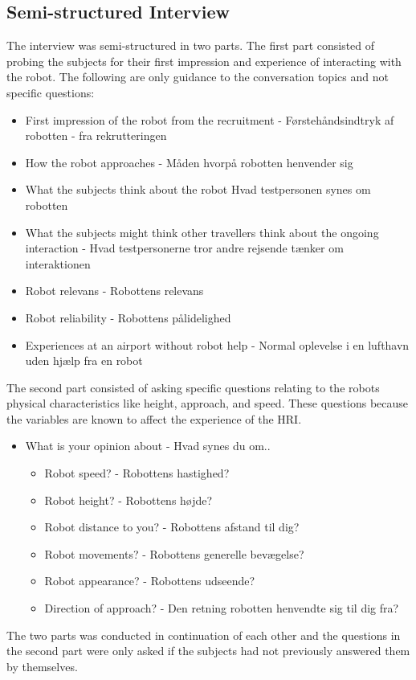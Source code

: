 \subsection{Semi-structured Interview}
The interview was semi-structured in two parts. The first part consisted of probing the subjects for their first impression and experience of interacting with the robot. The following are only guidance to the conversation topics and not specific questions:\\ 
%
\begin{itemize}
\item First impression of the robot from the recruitment -  Førstehåndsindtryk af robotten - fra rekrutteringen
\item How the robot approaches - Måden hvorpå robotten henvender sig
\item What the subjects think about the robot Hvad testpersonen synes om robotten
\item What the subjects might think other travellers think about the ongoing interaction - Hvad testpersonerne tror andre rejsende tænker om interaktionen 
\item Robot relevans - Robottens relevans
\item Robot reliability - Robottens pålidelighed
\item Experiences at an airport without robot help - Normal oplevelse i en lufthavn uden hjælp fra en robot\\
\end{itemize}
\noindent
%
The second part consisted of asking specific questions relating to the robots physical characteristics like height, approach, and speed. These questions because the variables are known to affect the experience of the HRI.\\
%
\begin{itemize}
\item What is your opinion about - Hvad synes du om..
	\begin{itemize}
		\item Robot speed? - Robottens hastighed?
		\item Robot height? - Robottens højde?
		\item Robot distance to you? - Robottens afstand til dig?
		\item Robot movements? - Robottens generelle bevægelse?
		\item Robot appearance? -  Robottens udseende?
		\item Direction of approach? - Den retning robotten henvendte sig til dig fra?\\
	\end{itemize}
\end{itemize}
%
The two parts was conducted in continuation of each other and the questions in the second part were only asked if the subjects had not previously answered them by themselves.
 
